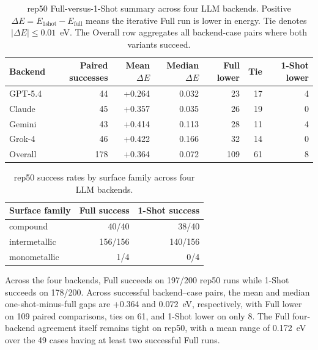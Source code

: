 \documentclass[%
 preprint,
 superscriptaddress,
 amsmath,amssymb,
 aps,
 prb,
 floatfix,
]{revtex4-2}
\begin{document}
\begin{table}[ht]
\centering
\small
\caption{rep50 Full-versus-1-Shot summary across four LLM backends. Positive $\Delta E = E_{\mathrm{1shot}} - E_{\mathrm{full}}$ means the iterative Full run is lower in energy. Tie denotes $|\Delta E| \leq 0.01$~eV. The Overall row aggregates all backend-case pairs where both variants succeed.}
\label{tab:si-rep50-four-backend-summary}
\begin{tabular}{lrrrrrr}
\toprule
Backend & Paired successes & Mean $\Delta E$ & Median $\Delta E$ & Full lower & Tie & 1-Shot lower \\
\midrule
GPT-5.4 & 44 & +0.264 & 0.032 & 23 & 17 & 4 \\
Claude & 45 & +0.357 & 0.035 & 26 & 19 & 0 \\
Gemini & 43 & +0.414 & 0.113 & 28 & 11 & 4 \\
Grok-4 & 46 & +0.422 & 0.166 & 32 & 14 & 0 \\
Overall & 178 & +0.364 & 0.072 & 109 & 61 & 8 \\
\bottomrule
\end{tabular}
\end{table}

\begin{table}[ht]
\centering
\small
\caption{rep50 success rates by surface family across four LLM backends.}
\label{tab:si-rep50-family-success}
\begin{tabular}{lrr}
\toprule
Surface family & Full success & 1-Shot success \\
\midrule
compound & 40/40 & 38/40 \\
intermetallic & 156/156 & 140/156 \\
monometallic & 1/4 & 0/4 \\
\bottomrule
\end{tabular}
\end{table}

Across the four backends, Full succeeds on 197/200 rep50 runs while 1-Shot succeeds on 178/200.
Across successful backend--case pairs, the mean and median one-shot-minus-full gaps are +0.364 and 0.072~eV, respectively, with Full lower on 109 paired comparisons, ties on 61, and 1-Shot lower on only 8.
The Full four-backend agreement itself remains tight on rep50, with a mean range of 0.172~eV over the 49 cases having at least two successful Full runs.
\end{document}
